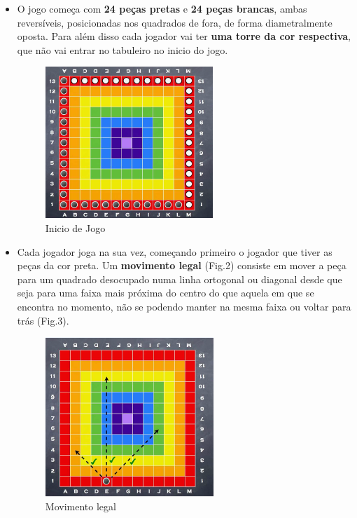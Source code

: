 \documentclass[a4paper]{article}
\begin{document}
\begin{itemize}
	\item O jogo começa com \textbf{24 peças pretas} e \textbf{24 peças brancas}, ambas reversíveis, posicionadas nos quadrados de fora, de forma diametralmente oposta. Para além disso cada jogador vai ter \textbf{uma torre da cor respectiva}, que não vai entrar no tabuleiro no inicio do jogo. 
\begin{figure}[h!]
\begin{center}
\includegraphics[scale=0.9]{fig1.png}
\caption{Inicio de Jogo}
\end{center}
\end{figure}

\item Cada jogador joga na sua vez, começando primeiro o jogador que tiver as peças da cor preta. Um \textbf{movimento legal} (Fig.2) consiste em mover a peça para um quadrado desocupado numa linha ortogonal ou diagonal desde que seja para uma faixa mais próxima do centro do que aquela em que se encontra no momento, não se podendo manter na mesma faixa ou voltar para trás (Fig.3).

\begin{figure}[h!]
\begin{center}
\includegraphics[scale=0.9]{fig2.png}
\caption{Movimento legal}
\end{center}
\end{figure}


\end{itemize}
\end{document}
